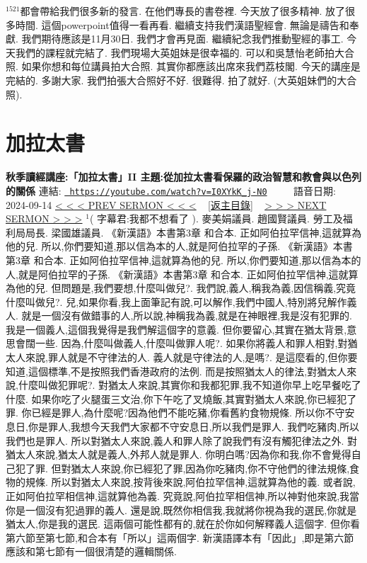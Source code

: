 \documentclass{book}
\begin{document}
$^{1521}$都會帶給我們很多新的發言.
在他們專長的書卷裡.
今天放了很多精神.
放了很多時間.
這個powerpoint值得一看再看.
繼續支持我們漢語聖經會.
無論是禱告和奉獻.
我們期待應該是11月30日.
我們才會再見面.
繼續紀念我們推動聖經的事工.
今天我們的課程就完結了.
我們現場大英姐妹是很幸福的.
可以和吳慧怡老師拍大合照.
如果你想和每位講員拍大合照.
其實你都應該出席來我們荔枝閣.
今天的講座是完結的.
多謝大家.
我們拍張大合照好不好.
很難得.
拍了就好.
(大英姐妹們的大合照).
\newpage



\section{加拉太書}
\label{sec:I0XYkK_j_N0}
\textbf{秋季讀經講座:「加拉太書」II 主題:從加拉太書看保羅的政治智慧和教會與以色列的關係}
\newline
\newline
連結: \href{https://youtube.com/watch?v=I0XYkK_j-N0}{\texttt{ https://youtube.com/watch?v=I0XYkK\_j-N0}} ~~~~ 語音日期: 2024-09-14 
\newline
\newline
\hyperref[sec:sEvrhOW5UYA]{\small{< < < PREV SERMON < < <}}
~
\hyperref[sec:index]{\small{[返主目錄]}}
~
\hyperref[sec:JHWtWav3_Y8]{\small{> > > NEXT SERMON > > >}}
\newline
\newline
$^{1}$( 字幕君:我都不想看了 ).
麥美娟議員.
趙國賢議員.
勞工及福利局局長.
梁國雄議員.
《新漢語》本書第3章 和合本.
正如阿伯拉罕信神,這就算為他的兒.
所以,你們要知道,那以信為本的人,就是阿伯拉罕的子孫.
《新漢語》本書第3章 和合本.
正如阿伯拉罕信神,這就算為他的兒.
所以,你們要知道,那以信為本的人,就是阿伯拉罕的子孫.
《新漢語》本書第3章 和合本.
正如阿伯拉罕信神,這就算為他的兒.
但問題是,我們要想,什麼叫做兒?.
我們說,義人,稱我為義,因信稱義,究竟什麼叫做兒?.
兒,如果你看,我上面筆記有說,可以解作,我們中國人,特別將兒解作義人.
就是一個沒有做錯事的人,所以說,神稱我為義,就是在神眼裡,我是沒有犯罪的.
我是一個義人,這個我覺得是我們解這個字的意義.
但你要留心,其實在猶太背景,意思會闊一些.
因為,什麼叫做義人,什麼叫做罪人呢?.
如果你將義人和罪人相對,對猶太人來說,罪人就是不守律法的人.
義人就是守律法的人,是嗎?.
是這麼看的,但你要知道,這個標準,不是按照我們香港政府的法例.
而是按照猶太人的律法,對猶太人來說,什麼叫做犯罪呢?.
對猶太人來說,其實你和我都犯罪,我不知道你早上吃早餐吃了什麼.
如果你吃了火腿蛋三文治,你下午吃了叉燒飯,其實對猶太人來說,你已經犯了罪.
你已經是罪人,為什麼呢?因為他們不能吃豬,你看舊約食物規條.
所以你不守安息日,你是罪人,我想今天我們大家都不守安息日,所以我們是罪人.
我們吃豬肉,所以我們也是罪人.
所以對猶太人來說,義人和罪人除了說我們有沒有觸犯律法之外.
對猶太人來說,猶太人就是義人,外邦人就是罪人.
你明白嗎?因為你和我,你不會覺得自己犯了罪.
但對猶太人來說,你已經犯了罪,因為你吃豬肉,你不守他們的律法規條,食物的規條.
所以對猶太人來說,按背後來說,阿伯拉罕信神,這就算為他的義.
或者說,正如阿伯拉罕相信神,這就算他為義.
究竟說,阿伯拉罕相信神,所以神對他來說,我當你是一個沒有犯過罪的義人.
還是說,既然你相信我,我就將你視為我的選民,你就是猶太人,你是我的選民.
這兩個可能性都有的,就在於你如何解釋義人這個字.
但你看第六節至第七節,和合本有「所以」這兩個字.
新漢語譯本有「因此」,即是第六節應該和第七節有一個很清楚的邏輯關係.
\end{document}

